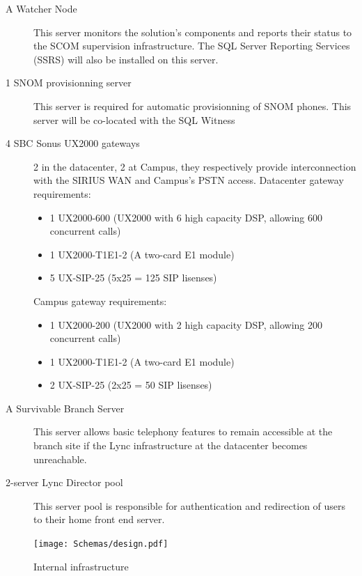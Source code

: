 \begin{description}
		\item[A Watcher Node] This server monitors the solution's components and reports their status to the SCOM supervision infrastructure. The SQL Server Reporting Services (SSRS) will also be installed on this server.
		
		\item[1 SNOM provisionning server] This server is required for automatic provisionning of SNOM phones. This server will be co-located with the SQL Witness
		
		\item[4 SBC Sonus UX2000 gateways] 2 in the datacenter, 2 at Campus, they respectively provide interconnection with the SIRIUS WAN and Campus's PSTN access.
		Datacenter gateway requirements:
		\begin{itemize}
			\item 1 UX2000-600 (UX2000 with 6 high capacity DSP, allowing 600 concurrent calls)
			\item 1 UX2000-T1E1-2 (A two-card E1 module)
			\item 5 UX-SIP-25 (5x25 = 125 SIP lisenses)
		\end{itemize}
		Campus gateway requirements:
		\begin{itemize}
			\item 1 UX2000-200 (UX2000 with 2 high capacity DSP, allowing 200 concurrent calls)
			\item 1 UX2000-T1E1-2 (A two-card E1 module)
			\item 2 UX-SIP-25 (2x25 = 50 SIP lisenses)
		\end{itemize}
		
		
		\item[A Survivable Branch Server] This server allows basic telephony features to remain accessible at the branch site if the Lync infrastructure at the datacenter becomes unreachable.
		
		
		\item[2-server Lync Director pool] This server pool is responsible for authentication and redirection of users to their home front end server.
		
	\end{description}

\begin{figure}[H]
	\centering
	\texttt{[image: Schemas/design.pdf]}
	\caption{Internal infrastructure}
	\label{fig:case_internal}
\end{figure}


